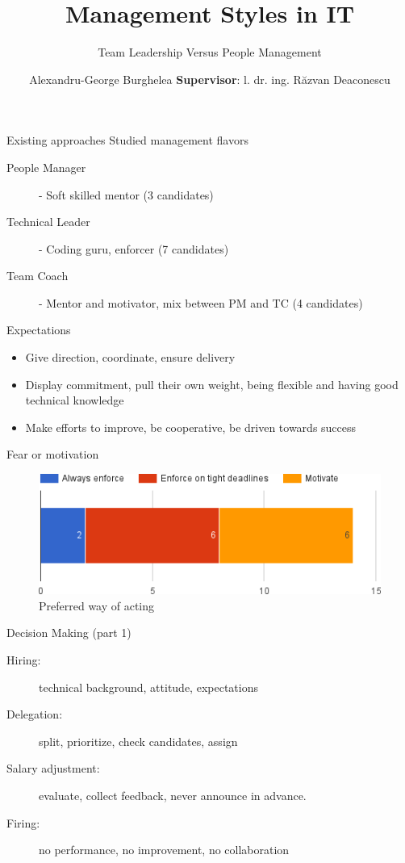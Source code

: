 \documentclass{beamer}
\title{Management Styles in IT}
\subtitle{Team Leadership Versus People Management}
\author{Alexandru-George Burghelea \newline
  \textbf{Supervisor}: \cb{S}l. dr. ing. R\u{a}zvan Deaconescu}
\begin{document}
\frame{\titlepage}

\begin{frame}{Existing approaches}
Studied management flavors
\begin{description}
  \item [People Manager] - Soft skilled mentor (3 candidates)
  \item [Technical Leader] - Coding guru, enforcer (7 candidates)
  \item [Team Coach] - Mentor and motivator, mix between PM and TC (4 candidates)
  
\end{description}
\end{frame}

\begin{frame}{Expectations}
\begin{itemize}
\item Give direction, coordinate, ensure delivery
\item Display commitment, pull their own weight, being flexible and having good technical knowledge
\item Make efforts to improve, be cooperative, be driven towards success
\end{itemize}

\end{frame}

\begin{frame}{Fear or motivation}
\begin{figure}[h]
  \centering
  \includegraphics[scale=0.5]{wayofacting.png}
  \caption{Preferred way of acting}
  \label{fig:axbgrid}
\end{figure}

\end{frame}

\begin{frame}{Decision Making (part 1)}
\begin{description}
\item[Hiring:] technical background, attitude, expectations
\item[Delegation:] split, prioritize, check candidates, assign
\item[Salary adjustment:] evaluate, collect feedback, never announce in advance.
\item[Firing:] no performance, no improvement, no collaboration
\end{description}
\end{frame}
\end{document}
